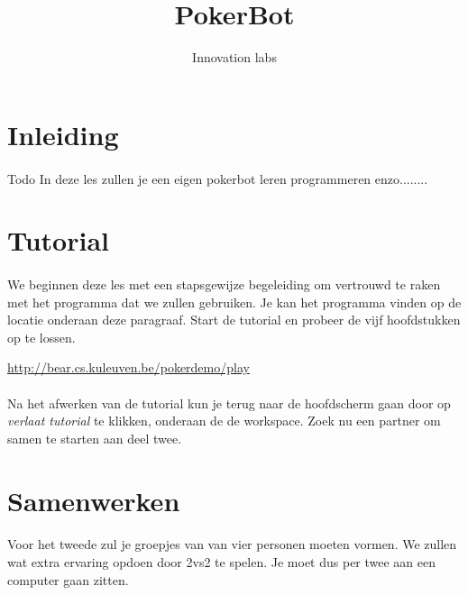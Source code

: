 \documentclass{article}
\begin{document}
\date{}
\title{PokerBot}
\author{Innovation labs}
\maketitle

\section*{Inleiding}

\paragraph{} Todo In deze les zullen je een eigen pokerbot leren programmeren enzo........ 

\section{Tutorial}

	\paragraph{} We beginnen deze les met een stapsgewijze begeleiding om vertrouwd te raken met het programma dat we zullen gebruiken. Je kan het programma vinden op de locatie onderaan deze paragraaf. Start de tutorial en probeer de vijf hoofdstukken op te lossen.
    
    \vspace{4mm}
    \url{http://bear.cs.kuleuven.be/pokerdemo/play}
    
    \paragraph{} Na het afwerken van de tutorial kun je terug naar de hoofdscherm gaan door op \emph{verlaat tutorial} te klikken, onderaan de de workspace. Zoek nu een partner om samen te starten aan deel twee.

\section{Samenwerken}

	\paragraph{} Voor het tweede zul je groepjes van van vier personen moeten vormen. We zullen wat extra ervaring opdoen door 2vs2 te spelen. Je moet dus per twee aan een computer gaan zitten.
    
\end{document}
